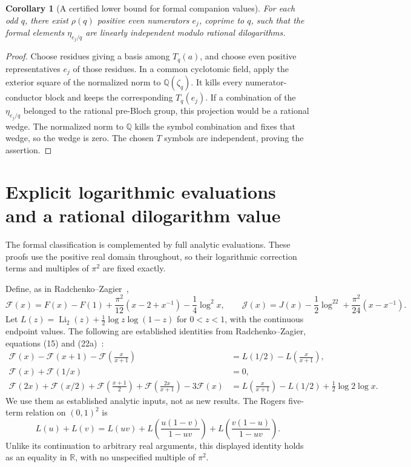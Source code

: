 \documentclass[11pt,a4paper]{article}
\newtheorem{corollary}[theorem]{Corollary}
\theoremstyle{definition}
\theoremstyle{remark}
\numberwithin{equation}{section}
\begin{document}
\begin{corollary}[A certified lower bound for formal companion values]
\label{jnew:cor:value-rank}
For each odd $q$, there exist $\rho(q)$ positive even numerators
$e_j$, coprime to $q$, such that the formal elements
$\eta_{e_j/q}$ are linearly independent modulo rational
dilogarithms.
\end{corollary}
\begin{proof}
Choose residues giving a basis among $T_q(a)$, and choose even
positive representatives $e_j$ of those residues. In a common
cyclotomic field, apply the exterior square of the normalized norm
to $\mathbb Q(\zeta_q)$. It kills every numerator-conductor block
and keeps the corresponding $T_q(e_j)$. If a combination of the
$\eta_{e_j/q}$ belonged to the rational pre-Bloch group, this
projection would be a rational wedge. The normalized norm to
$\mathbb Q$ kills the symbol combination and fixes that wedge, so
the wedge is zero. The chosen $T$ symbols are independent, proving
the assertion.
\end{proof}
\section{Explicit logarithmic evaluations and a rational dilogarithm value}
\label{jnew:sec:analytic}

The formal classification is complemented by full analytic evaluations.
These proofs use the positive real domain throughout, so their
logarithmic correction terms and multiples of $\pi^2$ are fixed exactly.

Define, as in Radchenko--Zagier~\cite{RadchenkoZagier},
\[
 \mathcal F(x)=F(x)-F(1)
  +\frac{\pi^2}{12}(x-2+x^{-1})-\frac14\log^2x,
 \qquad
 \mathcal J(x)=J(x)-\frac12\log^22
  +\frac{\pi^2}{24}(x-x^{-1}).
\]
Let $L(z)=\operatorname{Li}_2(z)+\tfrac12\log z\log(1-z)$ for
$0<z<1$, with the continuous endpoint values. The following are
established identities from Radchenko--Zagier,
equations (15) and (22a)~\cite{RadchenkoZagier}:
\begin{align}
 \mathcal F(x)-\mathcal F(x+1)-\mathcal F\left(\frac{x}{x+1}\right)
 &=L(1/2)-L\left(\frac{x}{x+1}\right),
 \label{jnew:eq:RZ-three}\\
 \mathcal F(x)+\mathcal F(1/x)&=0,
 \label{jnew:eq:RZ-recip}\\
 \mathcal F(2x)+\mathcal F(x/2)
 +\mathcal F\left(\frac{x+1}{2}\right)
 +\mathcal F\left(\frac{2x}{x+1}\right)-3\mathcal F(x)
 &=L\left(\frac{x}{x+1}\right)-L(1/2)
   +\tfrac12\log2\log x.
 \label{jnew:eq:RZ-Hecke2}
\end{align}
We use them as established analytic inputs, not as new results.
The Rogers five-term relation on $(0,1)^2$ is
\begin{equation}\label{jnew:eq:Rogers}
 L(u)+L(v)=L(uv)+L\left(\frac{u(1-v)}{1-uv}\right)
                    +L\left(\frac{v(1-u)}{1-uv}\right).
\end{equation}
Unlike its continuation to arbitrary real arguments, this displayed
identity holds as an equality in $\mathbb R$, with no unspecified
multiple of $\pi^2$.
\end{document}
